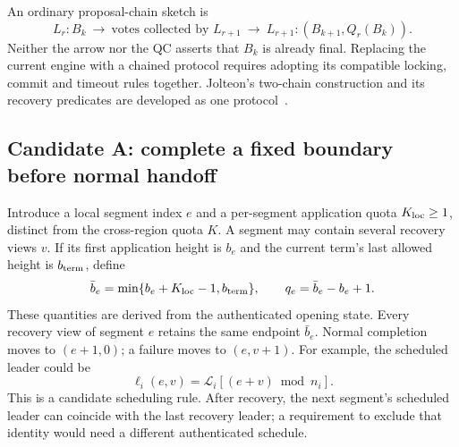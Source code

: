 An ordinary proposal-chain sketch is
\[
 L_r:B_k\ \longrightarrow\ \text{votes collected by }L_{r+1}
 \ \longrightarrow\ L_{r+1}:(B_{k+1},Q_r(B_k)).
\]
Neither the arrow nor the QC asserts that $B_k$ is already final. Replacing
the current engine with a chained protocol requires adopting its compatible
locking, commit and timeout rules together. Jolteon's two-chain construction
and its recovery predicates are developed as one protocol~\cite{jolteon}.

\subsection{Candidate A: complete a fixed boundary before normal handoff}
\label{sec:local-boundary-design}
Introduce a local segment index $e$ and a per-segment application quota
$K_{\rm loc}\geq1$, distinct from the cross-region quota $K$. A segment may
contain several recovery views $v$. If its first application height is
$b_e$ and the current term's last allowed height is $b_{\rm term}$, define
\[
 \bar b_e=\min\{b_e+K_{\rm loc}-1,b_{\rm term}\},\qquad
 q_e=\bar b_e-b_e+1.
\]
These quantities are derived from the authenticated opening state. Every
recovery view of segment $e$ retains the same endpoint $\bar b_e$.
Normal completion moves to $(e+1,0)$; a failure moves to $(e,v+1)$.
For example, the scheduled leader could be
\[
 \ell_i(e,v)=\mathcal L_i[(e+v)\bmod n_i].
\]
This is a candidate scheduling rule. After recovery, the next segment's
scheduled leader can coincide with the last recovery leader; a requirement
to exclude that identity would need a different authenticated schedule.

